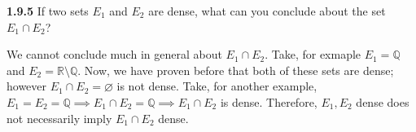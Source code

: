 \documentclass[12pt]{article}
\newcommand{\Q}{\mathbb{Q}}
\newcommand{\R}{\mathbb{R}}
\begin{document}
\begin{problem}\textbf{1.9.5}
If two sets $E_1$ and $E_2$ are dense, what can you conclude about the set $E_1\cap E_2$?
\end{problem}
\begin{solution}\newline
	We cannot conclude much in general about $E_1\cap E_2$.\newline
Take, for exmaple $E_1=\Q$ and $E_2=\R\setminus\Q$.\newline
Now, we have proven before that both of these sets are dense; however $E_1\cap E_2=\varnothing$ is not dense.\newline
Take, for another example, $E_1=E_2=\Q\implies E_1\cap E_2=\Q\implies E_1\cap E_2$ is dense.\newline
Therefore, $E_1,E_2$ dense does not necessarily imply $E_1\cap E_2$ dense.
\end{solution}
\end{document}
